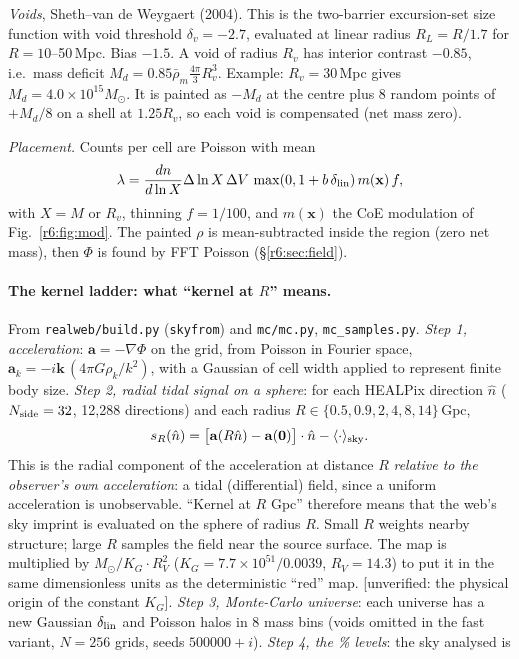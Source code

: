\documentclass[11pt]{article}
\newcommand{\flag}[1]{\textsf{[unverified: #1]}}
\begin{document}
\emph{Voids}, Sheth--van de Weygaert (2004). This is the two-barrier excursion-set size function with void threshold $\delta_v=-2.7$, evaluated at linear radius $R_L=R/1.7$ for $R=10$--50\,Mpc. Bias $-1.5$. A void of radius $R_v$ has interior contrast $-0.85$, i.e.\ mass deficit $M_d=0.85\bar\rho_m\tfrac{4\pi}{3}R_v^3$. Example: $R_v=30$\,Mpc gives $M_d=4.0\times10^{15}M_\odot$. It is painted as $-M_d$ at the centre plus 8 random points of $+M_d/8$ on a shell at $1.25R_v$, so each void is compensated (net mass zero).

\emph{Placement.} Counts per cell are Poisson with mean
\begin{equation}\label{r6:eq12}
\lambda=\frac{dn}{d\ln X}\Delta\ln X\,\Delta V\,\max(0,1+b\,\delta_{\rm lin})\,m(\mathbf x)\,f ,
\end{equation}
with $X=M$ or $R_v$, thinning $f=1/100$, and $m(\mathbf x)$ the CoE modulation of Fig.~\ref{r6:fig:mod}. The painted $\rho$ is mean-subtracted inside the region (zero net mass), then $\Phi$ is found by FFT Poisson (\S\ref{r6:sec:field}).

\paragraph{The kernel ladder: what ``kernel at $R$'' means.} From \texttt{realweb/build.py} (\texttt{skyfrom}) and \texttt{mc/mc.py}, \texttt{mc\_samples.py}. \emph{Step 1, acceleration}: $\mathbf a=-\nabla\Phi$ on the grid, from Poisson in Fourier space, $\mathbf a_k=-i\mathbf k\,(4\pi G\rho_k/k^2)$, with a Gaussian of cell width applied to represent finite body size. \emph{Step 2, radial tidal signal on a sphere}: for each HEALPix direction $\hat n$ ($N_{\rm side}=32$, 12{,}288 directions) and each radius $R\in\{0.5,0.9,2,4,8,14\}$\,Gpc,
\begin{equation}\label{r6:eq13}
s_R(\hat n)=\big[\mathbf a(R\hat n)-\mathbf a(\mathbf 0)\big]\cdot\hat n-\langle\cdot\rangle_{\rm sky}.
\end{equation}
This is the radial component of the acceleration at distance $R$ \emph{relative to the observer's own acceleration}: a tidal (differential) field, since a uniform acceleration is unobservable. ``Kernel at $R$ Gpc'' therefore means that the web's sky imprint is evaluated on the sphere of radius $R$. Small $R$ weights nearby structure; large $R$ samples the field near the source surface. The map is multiplied by $M_\odot/K_G\cdot R_V^2$ ($K_G=7.7\times10^{51}/0.0039$, $R_V=14.3$) to put it in the same dimensionless units as the deterministic ``red'' map. \flag{the physical origin of the constant $K_G$}. \emph{Step 3, Monte-Carlo universe}: each universe has a new Gaussian $\delta_{\rm lin}$ and Poisson halos in 8 mass bins (voids omitted in the fast variant, $N=256$ grids, seeds $500000+i$). \emph{Step 4, the \% levels}: the sky analysed is
\end{document}

